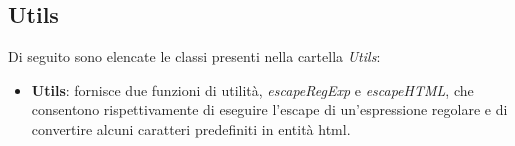 \subsection{Utils}

\par Di seguito sono elencate le classi presenti nella cartella \textit{Utils}:

\begin{itemize}
  \item \textbf{Utils}: fornisce due funzioni di utilità, \textit{escapeRegExp} e \textit{escapeHTML}, che consentono rispettivamente di eseguire l’escape di un’espressione regolare e di convertire alcuni caratteri predefiniti in entità \gls{html}. 
\end{itemize}
